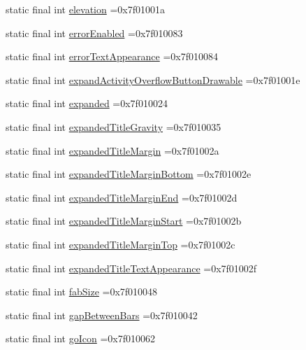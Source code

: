 \begin{DoxyCompactItemize}
\item 
static final int \hyperlink{classcheck_1_1test_1_1_r_1_1attr_acf20b055f3e563dc5c426990bf2b3b7e}{elevation} =0x7f01001a
\item 
static final int \hyperlink{classcheck_1_1test_1_1_r_1_1attr_ab02dbe7a6470efb4a4d469eeea265e7f}{error\+Enabled} =0x7f010083
\item 
static final int \hyperlink{classcheck_1_1test_1_1_r_1_1attr_a8e9145212f04c891aeee85ee7abbd939}{error\+Text\+Appearance} =0x7f010084
\item 
static final int \hyperlink{classcheck_1_1test_1_1_r_1_1attr_a4e579a55463671fe043ac88526bf948b}{expand\+Activity\+Overflow\+Button\+Drawable} =0x7f01001e
\item 
static final int \hyperlink{classcheck_1_1test_1_1_r_1_1attr_a92c0bde20e9439237e08ad4232347c4a}{expanded} =0x7f010024
\item 
static final int \hyperlink{classcheck_1_1test_1_1_r_1_1attr_ae2a60d204e002a5afb562ba3ba1fcd22}{expanded\+Title\+Gravity} =0x7f010035
\item 
static final int \hyperlink{classcheck_1_1test_1_1_r_1_1attr_ae7ba337e417e42b557bf230f1801e60c}{expanded\+Title\+Margin} =0x7f01002a
\item 
static final int \hyperlink{classcheck_1_1test_1_1_r_1_1attr_aecfd01acd4ec8625740c74f45afd13a6}{expanded\+Title\+Margin\+Bottom} =0x7f01002e
\item 
static final int \hyperlink{classcheck_1_1test_1_1_r_1_1attr_ac3625e75ee780dbfcc80b6559140ef24}{expanded\+Title\+Margin\+End} =0x7f01002d
\item 
static final int \hyperlink{classcheck_1_1test_1_1_r_1_1attr_a9e33e552c74573d94aec9c48307e0e40}{expanded\+Title\+Margin\+Start} =0x7f01002b
\item 
static final int \hyperlink{classcheck_1_1test_1_1_r_1_1attr_a81b637fdbd35044aace13d435adf27e1}{expanded\+Title\+Margin\+Top} =0x7f01002c
\item 
static final int \hyperlink{classcheck_1_1test_1_1_r_1_1attr_ae18599f9e5ed90eeaacf5b1b78f48d22}{expanded\+Title\+Text\+Appearance} =0x7f01002f
\item 
static final int \hyperlink{classcheck_1_1test_1_1_r_1_1attr_af156d88227185ae6207b4c9fd3d86037}{fab\+Size} =0x7f010048
\item 
static final int \hyperlink{classcheck_1_1test_1_1_r_1_1attr_ad145c34b60189d9c7ef95b0b8169ebcb}{gap\+Between\+Bars} =0x7f010042
\item 
static final int \hyperlink{classcheck_1_1test_1_1_r_1_1attr_aeed41eb5bc4a4ba79928aa878a07a01c}{go\+Icon} =0x7f010062

\end{DoxyCompactItemize}
